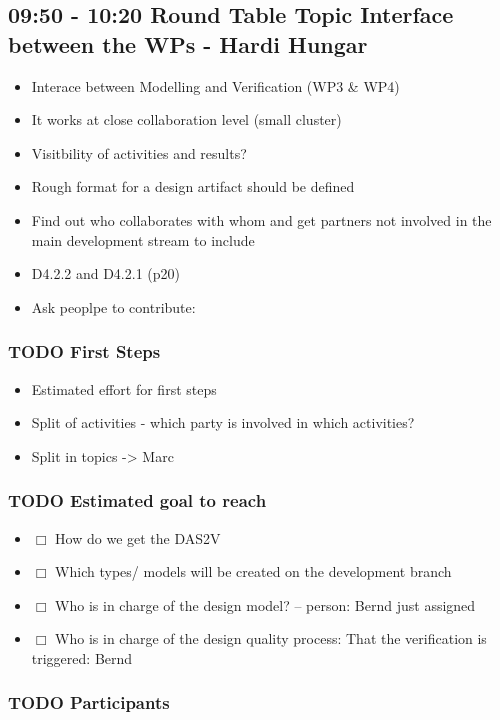 \documentclass[a4paper,german]{article}
\begin{document}
\subsection{09:50 - 10:20 Round Table Topic Interface between the WPs - Hardi Hungar}
\label{sec-1-2}

\begin{itemize}
\item Interace between Modelling and Verification (WP3 \& WP4)
\item It works at close collaboration level (small cluster)
\item Visitbility of activities and results?
\item Rough format for a design artifact should be defined
\item Find out who collaborates with whom and get partners not involved
       in the main development stream to include
\item D4.2.2 and D4.2.1 (p20)
\item Ask peoplpe to contribute:
\end{itemize}
\subsubsection{\textbf{TODO} First Steps}
\label{sec-1-2-1}

\begin{itemize}
\item Estimated effort for first steps
\item Split of activities - which party is involved in which activities?
\item Split in topics -> Marc
\end{itemize}
\subsubsection{\textbf{TODO} Estimated goal to reach}
\label{sec-1-2-2}

\begin{itemize}
\item $\Box$ How do we get the DAS2V
\item $\Box$ Which types/ models will be created on the development branch
\item $\Box$ Who is in charge of the design model? -- person: Bernd just assigned
\item $\Box$ Who is in charge of the design quality process: That the verification is triggered: Bernd
\end{itemize}
\subsubsection{\textbf{TODO} Participants}
\label{sec-1-2-3}
\end{document}
